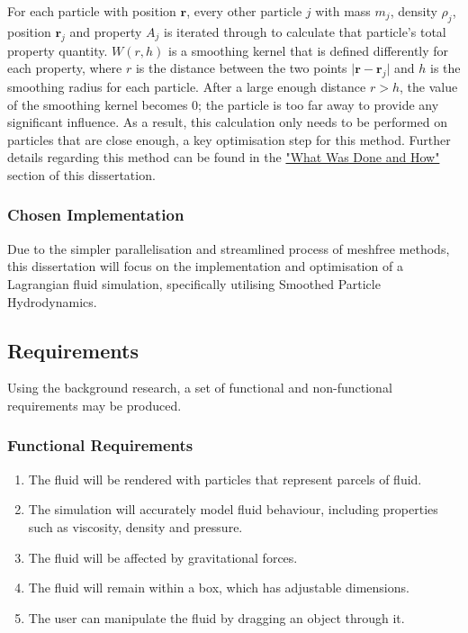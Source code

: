 \documentclass[12pt]{article}
\begin{document}
    For each particle with position $\textbf{r}$, every other particle $j$ with mass $m_j$, density $\rho_j$, position $\textbf{r}_j$ and property $A_j$ is iterated through to calculate that particle's total property quantity. $W(r, h)$ is a smoothing kernel that is defined differently for each property, where $r$ is the distance between the two points $\lvert\textbf{r} - \textbf{r}_j\rvert$ and $h$ is the smoothing radius for each particle. After a large enough distance $r > h$, the value of the smoothing kernel becomes 0; the particle is too far away to provide any significant influence. As a result, this calculation only needs to be performed on particles that are close enough, a key optimisation step for this method. Further details regarding this method can be found in the \hyperref[sec:whatwasdoneandhow]{"What Was Done and How"} section of this dissertation.

    \subsubsection{Chosen Implementation}

    Due to the simpler parallelisation and streamlined process of meshfree methods, this dissertation will focus on the implementation and optimisation of a Lagrangian fluid simulation, specifically utilising Smoothed Particle Hydrodynamics.

    \newpage

    \subsection{Requirements}

    Using the background research, a set of functional and non-functional requirements may be produced.

    \subsubsection{Functional Requirements}

    \begin{enumerate}[label=\textbf{F.R. \arabic*}]
        \item The fluid will be rendered with particles that represent parcels of fluid.
        \item The simulation will accurately model fluid behaviour, including properties such as viscosity, density and pressure.
        \item The fluid will be affected by gravitational forces.
        \item The fluid will remain within a box, which has adjustable dimensions.
        \item The user can manipulate the fluid by dragging an object through it.
    \end{enumerate}
\end{document}
